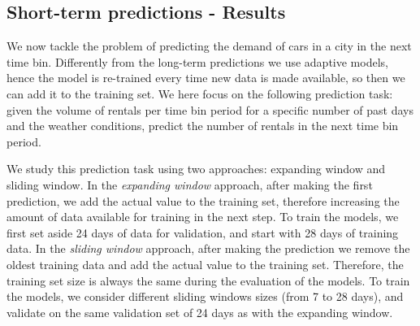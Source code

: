 
\subsection{Short-term predictions -  Results}

We now tackle the problem of predicting the demand of cars in a city in the next time bin. 
Differently from the long-term predictions we use adaptive models, hence the model is re-trained every time new data is made available, so then we can add it to the training set.
We here focus on the following prediction task: given the volume of rentals per time bin period for a specific number of past days and the weather conditions, predict the number of rentals in the next time bin period.

We study this prediction task using two approaches: expanding window and sliding window. 
In the \emph{expanding window} approach, after making the first prediction, we add the actual value to the training set, therefore increasing the amount of data available for training in the next step. 
To train the models, we first set aside 24 days of data for validation, and start with 28 days of training data. 
In the \emph{sliding window} approach, after making the prediction we remove the oldest training data and add the actual value to the training set. Therefore, the training set size is always the same during the evaluation of the models. To train the models, we consider different sliding windows sizes (from 7 to 28 days), and validate on the same validation set of 24 days as with the expanding window. 

